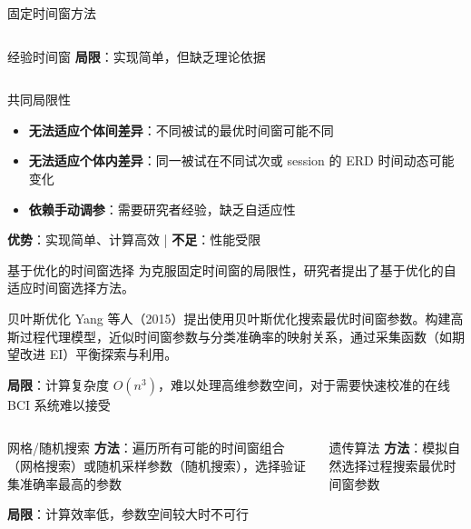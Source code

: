 {\begin{frame}{固定时间窗方法}
\begin{columns}[T]
\begin{block}{经验时间窗}
            \vspace{0.15cm}
            \textbf{局限}：实现简单，但缺乏理论依据
        \end{block}
    \end{columns}

    \begin{block}{共同局限性}
        \scriptsize
        \begin{itemize}
            \item \textbf{无法适应个体间差异}：不同被试的最优时间窗可能不同
            \item \textbf{无法适应个体内差异}：同一被试在不同试次或 session 的 ERD 时间动态可能变化
            \item \textbf{依赖手动调参}：需要研究者经验，缺乏自适应性
        \end{itemize}
    \end{block}

    \footnotesize
    \textbf{优势}：实现简单、计算高效 \quad | \quad \textbf{不足}：性能受限
\end{frame}

\begin{frame}{基于优化的时间窗选择}
    为克服固定时间窗的局限性，研究者提出了基于优化的自适应时间窗选择方法。

    \begin{block}{贝叶斯优化}
        \scriptsize
        Yang 等人（2015）提出使用贝叶斯优化搜索最优时间窗参数\cite{yang2015time}。构建高斯过程代理模型，近似时间窗参数与分类准确率的映射关系，通过采集函数（如期望改进 EI）平衡探索与利用。
        
        \textbf{局限}：计算复杂度 $O(n^3)$，难以处理高维参数空间，对于需要快速校准的在线 BCI 系统难以接受
    \end{block}

    \begin{columns}[T]
        \begin{block}{网格/随机搜索}
            \scriptsize
            \textbf{方法}：遍历所有可能的时间窗组合（网格搜索）或随机采样参数（随机搜索），选择验证集准确率最高的参数
            
            \textbf{局限}：计算效率低，参数空间较大时不可行
        \end{block}

        \begin{block}{遗传算法}
            \scriptsize
            \textbf{方法}：模拟自然选择过程搜索最优时间窗参数
            

\end{block}
\end{columns}
\end{frame}}
